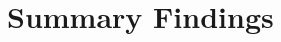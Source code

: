 \documentclass[11pt,a4paper]{article}
\newcommand{\ecc}{ECC-AODV}
\begin{document}

\section{Summary Findings}
\label{sec:findings}
\end{document}
